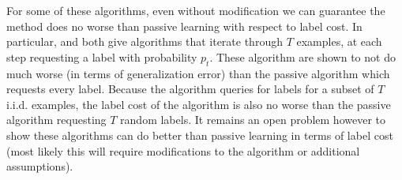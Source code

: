 \documentclass{article}
\begin{document}
For some of these algorithms, even without modification
we can guarantee the method does no worse than passive learning with
respect to label cost.  In particular, \citet{generalagnostic} and
\citet{importance} both give algorithms that iterate through $T$
examples, at each step requesting a label with probability $p_t$.
These algorithm are shown to not do much worse (in terms of
generalization error) than the passive algorithm which requests every
label.  Because the algorithm queries for labels for a subset of $T$
i.i.d. examples, the label cost of the algorithm is also no worse than
the passive algorithm requesting $T$ random labels.  It remains an
open problem however to show these algorithms can do better than
passive learning in terms of label cost (most likely this will require
modifications to the algorithm or additional assumptions).
\begin{small}
  
\end{small}
\end{document}
